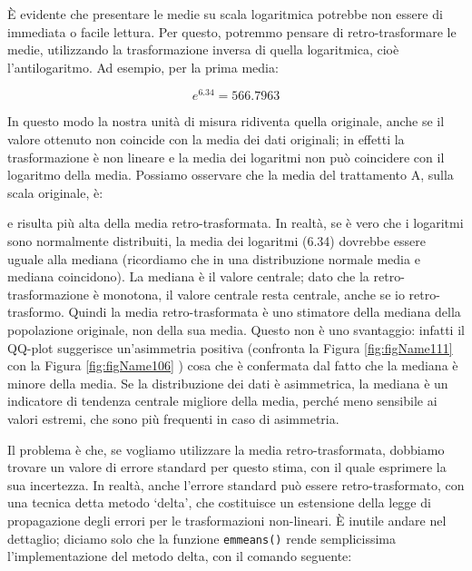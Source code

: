 \documentclass[a4paper,12pt,oneside]{book}
\newenvironment{Shaded}{\begin{snugshade}}{\end{snugshade}}
\newcommand{\SpecialCharTok}[1]{#1}
\newcommand{\StringTok}[1]{#1}
\newcommand{\DocumentationTok}[1]{#1}
\newcommand{\FunctionTok}[1]{#1}
\newcommand{\NormalTok}[1]{#1}
\begin{document}
È evidente che presentare le medie su scala logaritmica potrebbe non essere di immediata o facile lettura. Per questo, potremmo pensare di retro-trasformare le medie, utilizzando la trasformazione inversa di quella logaritmica, cioè l'antilogaritmo. Ad esempio, per la prima media:

\[e^{6.34} = 566.7963\]

In questo modo la nostra unità di misura ridiventa quella originale, anche se il valore ottenuto non coincide con la media dei dati originali; in effetti la trasformazione è non lineare e la media dei logaritmi non può coincidere con il logaritmo della media. Possiamo osservare che la media del trattamento A, sulla scala originale, è:

\begin{Shaded}
\end{Shaded}

e risulta più alta della media retro-trasformata. In realtà, se è vero che i logaritmi sono normalmente distribuiti, la media dei logaritmi (6.34) dovrebbe essere uguale alla mediana (ricordiamo che in una distribuzione normale media e mediana coincidono). La mediana è il valore centrale; dato che la retro-trasformazione è monotona, il valore centrale resta centrale, anche se io retro-trasformo. Quindi la media retro-trasformata è uno stimatore della mediana della popolazione originale, non della sua media. Questo non è uno svantaggio: infatti il QQ-plot suggerisce un'asimmetria positiva (confronta la Figura \ref{fig:figName111} con la Figura \ref{fig:figName106} ) cosa che è confermata dal fatto che la mediana è minore della media. Se la distribuzione dei dati è asimmetrica, la mediana è un indicatore di tendenza centrale migliore della media, perché meno sensibile ai valori estremi, che sono più frequenti in caso di asimmetria.

Il problema è che, se vogliamo utilizzare la media retro-trasformata, dobbiamo trovare un valore di errore standard per questo stima, con il quale esprimere la sua incertezza. In realtà, anche l'errore standard può essere retro-trasformato, con una tecnica detta metodo `delta', che costituisce un estensione della legge di propagazione degli errori per le trasformazioni non-lineari. È inutile andare nel dettaglio; diciamo solo che la funzione \texttt{emmeans()} rende semplicissima l'implementazione del metodo delta, con il comando seguente:
\end{document}
